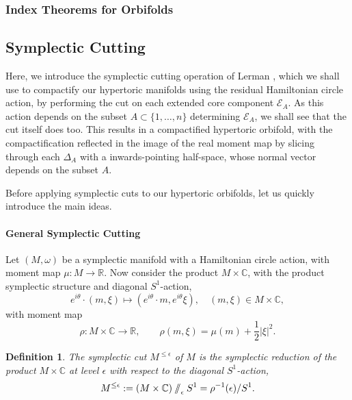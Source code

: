 \documentclass{amsart}
\newtheorem{defn}[theorem]{Definition\rm}
\newcommand{\ra}{\rightarrow}
\newcommand{\w}{\omega}
\newcommand{\e}{\epsilon}
\newcommand{\RR}{\mathbb{R}}
\newcommand{\CC}{\mathbb{C}}
\newcommand{\mcE}{\mathcal{E}}
\newcommand{\sslash}{\mathbin{/\mkern-6mu/}}
\begin{document}
    \subsubsection{Index Theorems for Orbifolds}
    
    

	\subsection{Symplectic Cutting}
	
	Here, we introduce the symplectic cutting operation of Lerman \cite{Ler95}, which we shall use to compactify our hypertoric manifolds using the residual Hamiltonian circle action, by performing the cut on each extended core component $\mcE_{A}$. As this action depends on the subset $A \subset \{1, \ldots, n\}$ determining $\mcE_{A}$, we shall see that the cut itself does too. This results in a compactified hypertoric orbifold, with the compactification reflected in the image of the real moment map by slicing through each $\Delta_{A}$ with a inwards-pointing half-space, whose normal vector depends on the subset $A$.
	
	Before applying symplectic cuts to our hypertoric orbifolds, let us quickly introduce the main ideas.
	
	\paragraph{General Symplectic Cutting}
	
	Let $(M,\w)$ be a symplectic manifold with a Hamiltonian circle action, with moment map $\mu : M \ra \RR$. Now consider the product $M \times \CC$, with the product symplectic structure and diagonal $S^{1}$-action,
	\[
		e^{i\theta} \cdot (m, \xi) \longmapsto (e^{i\theta} \cdot m, e^{i\theta}\xi), \quad (m,\xi) \in M \times \CC,
	\]
	with moment map
	\[
		\rho : M \times \CC \ra \RR, \qquad \rho(m,\xi) = \mu(m) + \frac{1}{2}|\xi|^{2}.
	\]
	
	\begin{defn}
		The \emph{symplectic cut} $M^{\leq\e}$ of $M$ is the symplectic reduction of the product $M \times \CC$ at level $\e$ with respect to the diagonal $S^{1}$-action,
		\[
			M^{\leq\e} := (M \times \CC) \sslash_{\e} S^{1} = \rho^{-1}(\e)/S^{1}.
		\]
	\end{defn}
	
\end{document}
